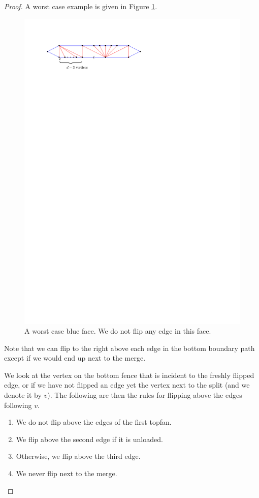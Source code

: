   \begin{proof}
  A worst case example is given in Figure \ref{fig:subdiv:worstCaseWithTopFan}.

  \begin{figure}[b]
    \centering
    \includegraphics[scale=1]{blueFaceSubdivision/img/worstCaseWithTopFan}
    \caption{A worst case blue face. We do not flip any edge in this face.}
    \label{fig:subdiv:worstCaseWithTopFan}
  \end{figure}

  Note that we can flip to the right above each edge in the bottom boundary path except if we would end up next to the merge.

  We look at the vertex on the bottom fence that is incident to the freshly flipped edge, or if we have not flipped an edge yet the vertex next to the split (and we denote it by $v$). The following are then the rules for flipping above the edges following $v$.
  \begin{enumerate}
    \item We do not flip above the edges of the first topfan.
    \item We flip above the second edge if it is unloaded.
    \item Otherwise, we flip above the third edge.
    \item We never flip next to the merge.
  \end{enumerate}


\end{proof}
